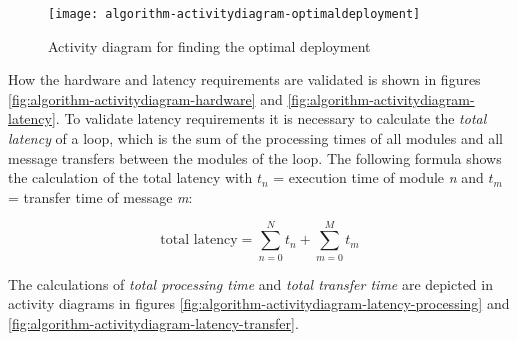 \begin{figure}[htb]
    \centering
    \texttt{[image: algorithm-activitydiagram-optimaldeployment]}
    \caption{Activity diagram for finding the optimal deployment}
    \label{fig:algorithm-activitydiagram-optimaldeployment}
\end{figure}

How the hardware and latency requirements are validated is shown in figures \ref{fig:algorithm-activitydiagram-hardware} and \ref{fig:algorithm-activitydiagram-latency}. To validate latency requirements it is necessary to calculate the \textit{total latency} of a loop, which is the sum of the processing times of all modules and all message transfers between the modules of the loop. The following formula shows the calculation of the total latency with $t_n$ = execution time of module \textit{n} and $t_m$ = transfer time of message \textit{m}:

\[ \textrm{total latency} = \sum_{n=0}^N t_n + \sum_{m=0}^M t_m\]

The calculations of \textit{total processing time} and \textit{total transfer time} are depicted in activity diagrams in figures \ref{fig:algorithm-activitydiagram-latency-processing} and \ref{fig:algorithm-activitydiagram-latency-transfer}.

